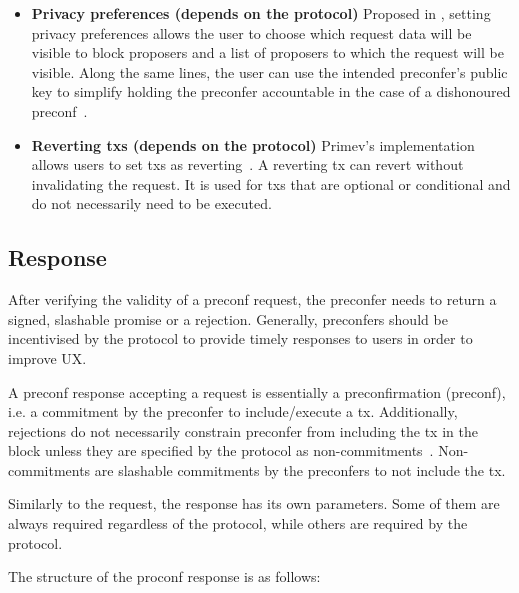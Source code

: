 \documentclass[conference]{IEEEtran}
\theoremstyle{boldstyle}
\begin{document}
\begin{itemize}
        \item \textbf{Privacy preferences (depends on the protocol)} Proposed in \cite{W:Towardsanimplementationofbasedpreconfirmationsleveragingrestaking}, setting privacy preferences allows the user to choose which request data will be visible to block proposers and a list of proposers to which the request will be visible. Along the same lines, the user can use the intended preconfer's public key to simplify holding the preconfer accountable in the case of a dishonoured preconf~\cite{W:AnalyzingBFTProposer-PromisedPreconfirmations}.
        \item \textbf{Reverting txs (depends on the protocol)} Primev's implementation allows users to set txs as reverting~\cite{W:Documentation-BidStructure}. A reverting tx can revert without invalidating the request. It is used for txs that are optional or conditional and do not necessarily need to be executed.
    \end{itemize}
    
    
    \subsection{Response}
    After verifying the validity of a preconf request, the preconfer needs to return a signed, slashable promise or a rejection. Generally, preconfers should be incentivised by the protocol to provide timely responses to users in order to improve UX.
    
    A preconf response accepting a request is essentially a preconfirmation (preconf), i.e. a commitment by the preconfer to include/execute a tx. Additionally, rejections do not necessarily constrain preconfer from including the tx in the block unless they are specified by the protocol as non-commitments~\cite{W:SolutionstothePreconfFairExchangeProblem}. Non-commitments are slashable commitments by the preconfers to not include the tx. 

    Similarly to the request, the response has its own parameters. Some of them are always required regardless of the protocol, while others are required by the protocol.

    The structure of the proconf response is as follows:
\end{document}
